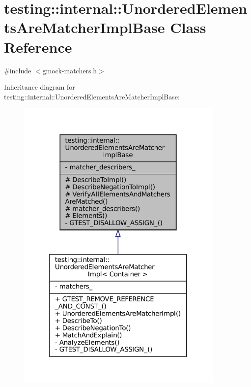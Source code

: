 \hypertarget{classtesting_1_1internal_1_1UnorderedElementsAreMatcherImplBase}{}\section{testing\+:\+:internal\+:\+:Unordered\+Elements\+Are\+Matcher\+Impl\+Base Class Reference}
\label{classtesting_1_1internal_1_1UnorderedElementsAreMatcherImplBase}


{\ttfamily \#include $<$gmock-\/matchers.\+h$>$}



Inheritance diagram for testing\+:\+:internal\+:\+:Unordered\+Elements\+Are\+Matcher\+Impl\+Base\+:
\nopagebreak
\begin{figure}[H]
\begin{center}
\leavevmode
\includegraphics[width=289pt]{classtesting_1_1internal_1_1UnorderedElementsAreMatcherImplBase__inherit__graph}
\end{center}
\end{figure}


